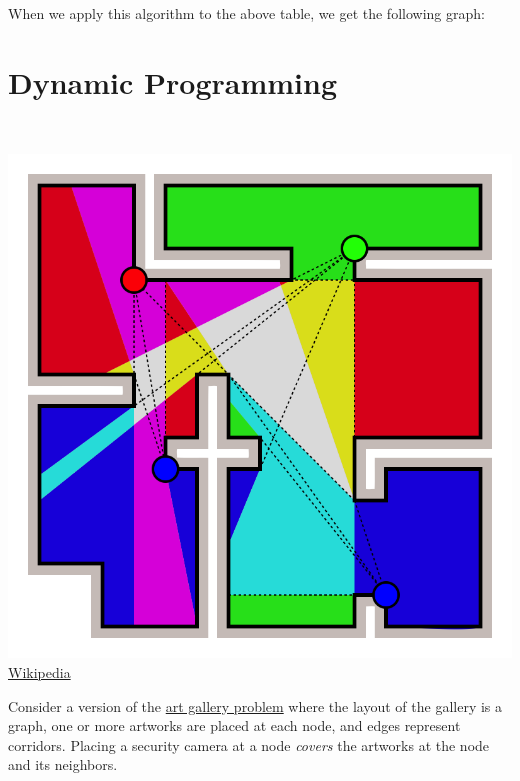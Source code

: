 \documentclass[addpoints,a4paper]{exam}
\begin{document}
\begin{questions}
\begin{solution}
\begin{enumerate}
			      When we apply this algorithm to the above table, we get the following graph:
		\end{enumerate}
	\end{solution}
	
	\section*{Dynamic Programming}
	\question \ \newline
	\begin{minipage}{0.2\linewidth}
		\centering
		\includegraphics[width=\textwidth,align=t]{gallery}\\
		\href{https://en.wikipedia.org/wiki/Art_gallery_problem}{Wikipedia}
	\end{minipage}
	\hfill
	\begin{minipage}{0.78\linewidth}
		Consider a version of the \href{https://en.wikipedia.org/wiki/Art_gallery_problem}{art gallery problem} where the layout of the gallery is a graph, one or more artworks are placed at each node, and edges represent corridors. Placing a security camera at a node \textit{covers} the artworks at the node and its neighbors.
\end{minipage}
\end{questions}
\end{document}
